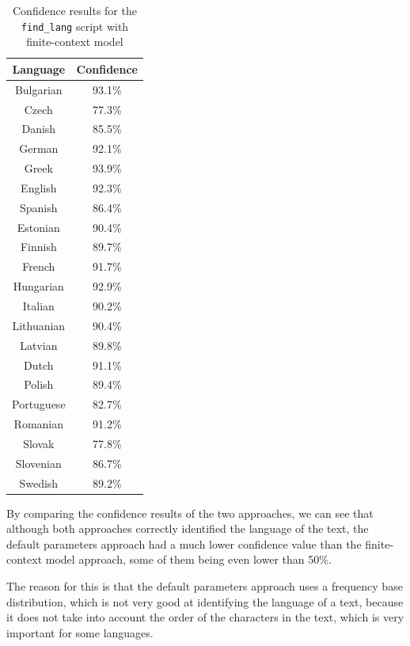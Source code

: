 \documentclass{article}
\begin{document}
\begin{table}
    \centering
    \begin{tabular}{|c|c|}
        \hline
        Language & Confidence \\
        \hline
        Bulgarian & 93.1\% \\
        Czech & 77.3\% \\
        Danish & 85.5\% \\
        German & 92.1\% \\
        Greek & 93.9\% \\
        English & 92.3\% \\
        Spanish & 86.4\% \\
        Estonian & 90.4\% \\
        Finnish & 89.7\% \\
        French & 91.7\% \\
        Hungarian & 92.9\% \\
        Italian & 90.2\% \\
        Lithuanian & 90.4\% \\
        Latvian & 89.8\% \\
        Dutch & 91.1\% \\
        Polish & 89.4\% \\
        Portuguese & 82.7\% \\
        Romanian & 91.2\% \\
        Slovak & 77.8\% \\
        Slovenian & 86.7\% \\
        Swedish & 89.2\% \\
        \hline
    \end{tabular}
    \caption{Confidence results for the \texttt{find\_lang} script with finite-context model}
    \label{tab:find_lang_finite_context_confidence}
\end{table}

By comparing the confidence results of the two approaches, we can see that although both approaches correctly identified the language of the text,
the default parameters approach had a much lower confidence value than the finite-context model approach, some of them being even lower than 50\%.

The reason for this is that the default parameters approach uses a frequency base distribution, which is not very good at identifying the language of a text,
because it does not take into account the order of the characters in the text, which is very important for some languages.
\end{document}
